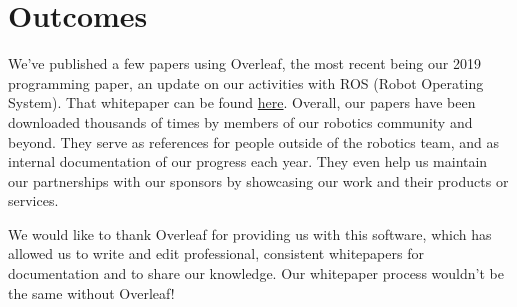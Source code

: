 \documentclass{zebracorns}
\begin{document}
\section{Outcomes}
We've published a few papers using Overleaf, the most recent being our 2019 programming paper, an update on our activities with ROS (Robot Operating System). That whitepaper can be found \href{https://team900.org/blog/ZebROS1.1/}{here}. Overall, our papers have been downloaded thousands of times by members of our robotics community and beyond. They serve as references for people outside of the robotics team, and as internal documentation of our progress each year. They even help us maintain our partnerships with our sponsors by showcasing our work and their products or services.

We would like to thank Overleaf for providing us with this software, which has allowed us to write and edit professional, consistent whitepapers for documentation and to share our knowledge. Our whitepaper process wouldn't be the same without Overleaf!
\end{document}
